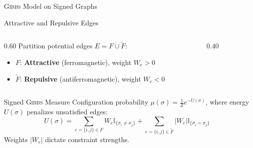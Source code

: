 \documentclass[A4,svgnames,9pt,aspectratio=169]{beamer}
\newcommand{\ind}[1]{\mathbb{I}_{\{#1\}}}
\begin{document}
\begin{frame}{\textsc{Gibbs} Model on Signed Graphs}
  \begin{block}{Attractive and Repulsive Edges}
    \begin{columns}[c]
      \begin{column}{0.60\textwidth}
        Partition potential edges $E = F \dot{\cup} \tilde{F}$:
        \begin{itemize}
          \item $F$: \textbf{Attractive} (ferromagnetic), weight $W_e > 0$
          \item $\tilde{F}$: \textbf{Repulsive} (antiferromagnetic), weight $W_e < 0$
        \end{itemize}
      \end{column}
      \begin{column}{0.40\textwidth}
        \centering
      \end{column}
    \end{columns}
  \end{block}
  \begin{block}{Signed \textsc{Gibbs} Measure \cite{Reichardt2006}}
    Configuration probability $\mu(\sigma) = \frac{1}{Z} e^{-U(\sigma)}$, where energy $U(\sigma)$ penalizes unsatisfied edges:
    \begin{equation*}
        U(\sigma) = \sum_{e=\{i,j\} \in F} W_e \ind{\sigma_i \neq \sigma_j} + \sum_{e=\{i,j\} \in \tilde{F}} |W_e| \ind{\sigma_i = \sigma_j}
    \end{equation*}
    Weights $|W_e|$ dictate constraint strengths.
  \end{block}
\end{frame}
\end{document}
